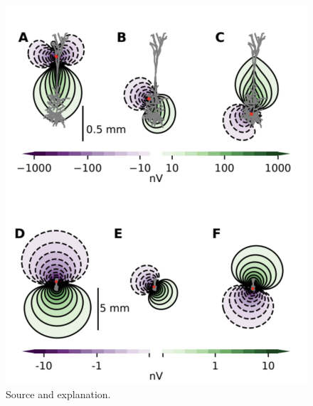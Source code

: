 \documentclass[a4paper, UKenglish, 11pt]{uiomaster}
\begin{document}
\begin{figure}
    \centering
    \includegraphics[width=\linewidth]{figures/dipole_pattern.png}
    \caption{Source and explanation.}
    \label{fig:dipole_pattern}
\end{figure}
\end{document}
